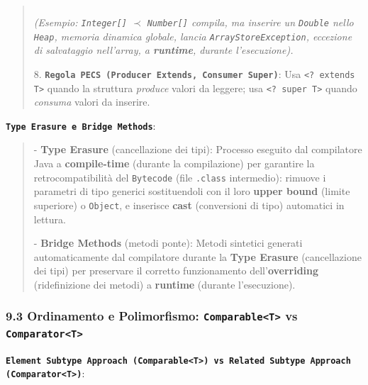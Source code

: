 \begin{quote}
\[\]



   \emph{(Esempio: \texttt{Integer[]} $\prec$ \texttt{Number[]} compila, ma inserire un \texttt{Double} nello \texttt{Heap}, memoria dinamica globale, lancia \texttt{ArrayStoreException}, eccezione di salvataggio nell'array, a \textbf{runtime}, durante l'esecuzione).}



8. \textbf{\texttt{Regola PECS (Producer Extends, Consumer Super)}}: Usa \texttt{<? extends T>} quando la struttura \emph{produce} valori da leggere; usa \texttt{<? super T>} quando \emph{consuma} valori da inserire.

\end{quote}

\textbf{\texttt{Type Erasure e Bridge Methods}}:

\begin{quote}\small

- \textbf{Type Erasure} (cancellazione dei tipi): Processo eseguito dal compilatore Java a \textbf{compile-time} (durante la compilazione) per garantire la retrocompatibilità del \texttt{Bytecode} (file \texttt{.class} intermedio): rimuove i parametri di tipo generici sostituendoli con il loro \textbf{upper bound} (limite superiore) o \texttt{Object}, e inserisce \textbf{cast} (conversioni di tipo) automatici in lettura.

- \textbf{Bridge Methods} (metodi ponte): Metodi sintetici generati automaticamente dal compilatore durante la \textbf{Type Erasure} (cancellazione dei tipi) per preservare il corretto funzionamento dell'\textbf{overriding} (ridefinizione dei metodi) a \textbf{runtime} (durante l'esecuzione).

\end{quote}

\subsubsection{9.3 Ordinamento e Polimorfismo: \texttt{Comparable<T>} vs \texttt{Comparator<T>}}\label{9-3-ordinamento-e-polimorfismo-comparable-t-vs-comparator-t}

\textbf{\texttt{Element Subtype Approach (Comparable<T>) vs Related Subtype Approach (Comparator<T>)}}:

